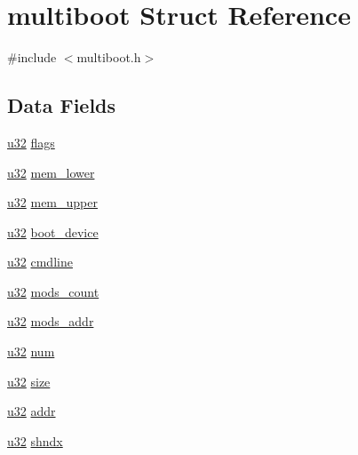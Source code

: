 \hypertarget{structmultiboot}{\section{multiboot Struct Reference}
\label{structmultiboot}
}


{\ttfamily \#include $<$multiboot.\-h$>$}

\subsection*{Data Fields}
\begin{DoxyCompactItemize}
\item 
\hyperlink{types_8h_a10e94b422ef0c20dcdec20d31a1f5049}{u32} \hyperlink{structmultiboot_a4bd2793467fd4f7ed02ec304fff4eb81}{flags}
\item 
\hyperlink{types_8h_a10e94b422ef0c20dcdec20d31a1f5049}{u32} \hyperlink{structmultiboot_ac2b15c0a29fd98a3e1d957c9f8b9bd0b}{mem\-\_\-lower}
\item 
\hyperlink{types_8h_a10e94b422ef0c20dcdec20d31a1f5049}{u32} \hyperlink{structmultiboot_a1aaf0f2c74463a9906e25ce50cd8e871}{mem\-\_\-upper}
\item 
\hyperlink{types_8h_a10e94b422ef0c20dcdec20d31a1f5049}{u32} \hyperlink{structmultiboot_adf150e01b0cdf6f201914cd8a44272f9}{boot\-\_\-device}
\item 
\hyperlink{types_8h_a10e94b422ef0c20dcdec20d31a1f5049}{u32} \hyperlink{structmultiboot_aec49b8fa70998fb8c40e10d3e085a011}{cmdline}
\item 
\hyperlink{types_8h_a10e94b422ef0c20dcdec20d31a1f5049}{u32} \hyperlink{structmultiboot_a96f82c08b21585317616beeacde278cc}{mods\-\_\-count}
\item 
\hyperlink{types_8h_a10e94b422ef0c20dcdec20d31a1f5049}{u32} \hyperlink{structmultiboot_ac64fd6bca4d231cbb450ba685a2b3400}{mods\-\_\-addr}
\item 
\hyperlink{types_8h_a10e94b422ef0c20dcdec20d31a1f5049}{u32} \hyperlink{structmultiboot_a6760a249410286719d6eec4e6074bdd6}{num}
\item 
\hyperlink{types_8h_a10e94b422ef0c20dcdec20d31a1f5049}{u32} \hyperlink{structmultiboot_a9f1d21c3f7b3071d7362b02dbc3f17e4}{size}
\item 
\hyperlink{types_8h_a10e94b422ef0c20dcdec20d31a1f5049}{u32} \hyperlink{structmultiboot_ab44163587f7ba8ca8f2b21e38a460525}{addr}
\item 
\hyperlink{types_8h_a10e94b422ef0c20dcdec20d31a1f5049}{u32} \hyperlink{structmultiboot_a62d5ef63cc8db466e77e24a7bcc0fea3}{shndx}

\end{DoxyCompactItemize}
